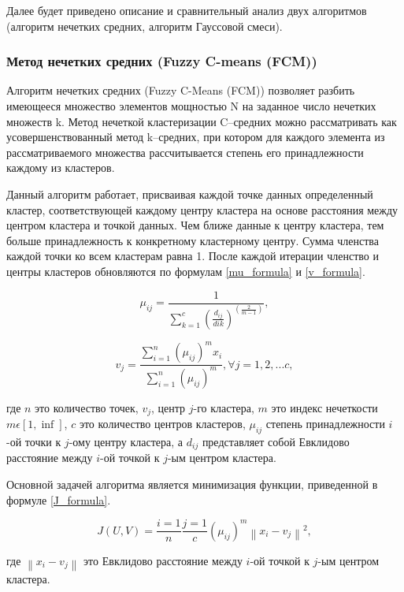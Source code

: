 Далее будет приведено описание и сравнительный анализ двух алгоритмов (алгоритм нечетких средних, алгоритм Гауссовой смеси).

\subsubsection{Метод нечетких средних (Fuzzy C-means (FCM))}

Алгоритм нечетких средних (Fuzzy C-Means (FCM)) позволяет разбить имеющееся множество элементов мощностью N на заданное число нечетких множеств k. Метод нечеткой кластеризации C–средних можно рассматривать как усовершенствованный метод k–средних, при котором для каждого элемента из рассматриваемого множества рассчитывается степень его принадлежности каждому из кластеров.

Данный алгоритм работает, присваивая каждой точке данных определенный кластер, соответствующей каждому центру кластера на основе расстояния между центром кластера и точкой данных. Чем ближе данные к центру кластера, тем больше принадлежность к конкретному кластерному центру. Сумма членства каждой точки ко всем кластерам равна 1. После каждой итерации членство и центры кластеров обновляются по формулам \ref{mu_formula} и \ref{v_formula}.

\begin{equation}
\label{mu_formula}
\mu_{ij} = \frac{1}{\sum_{k=1}^{c}(\frac{d_{ij}}{d{ik}}) ^{(\frac{2}{m-1})}},
\end{equation}

\begin{equation}
\label{v_formula}
v_j = \frac{\sum_{i=1}^{n}(\mu_{ij})^mx_i}{\sum_{i=1}^{n}(\mu_{ij})^m}, \forall j = 1, 2, ... c,
\end{equation}

где $n$ это количество точек, $v_j$, центр $j$-го кластера, $m$ это индекс нечеткости $m \epsilon [1, \inf]$, $c$ это количество центров кластеров, $\mu_{ij}$ степень принадлежности $i$-ой точки к $j$-ому центру кластера, а $d_{ij}$ представляет собой Евклидово расстояние между $i$-ой точкой к $j$-ым центром кластера.

Основной задачей алгоритма является минимизация функции, приведенной в формуле \ref{J_formula}.

\begin{equation}
\label{J_formula}
J(U, V) = \frac{i=1}{n}\frac{j=1}{c}(\mu_{ij})^m\left \|x_i - v_j\right \|^2,
\end{equation}

где $\left \|x_i - v_j\right \|$ это Евклидово расстояние между $i$-ой точкой к $j$-ым центром кластера.

